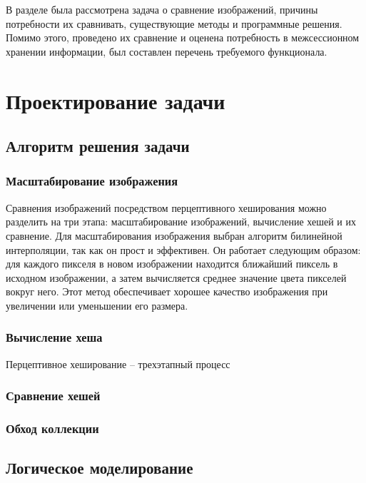 \documentclass[variant=courcework]{bsuir}
\begin{document}
В разделе была рассмотрена задача о сравнение изображений, причины потребности
их сравнивать, существующие методы и программные решения. Помимо этого,
проведено их сравнение и оценена потребность в межсессионном хранении
информации, был составлен перечень требуемого функционала.

\chapter{Проектирование задачи}

\section{Алгоритм решения задачи}

\subsection{Масштабирование изображения}
Сравнения изображений посредством перцептивного хеширования можно разделить на
три этапа: масштабирование изображений, вычисление хешей и их сравнение. Для
масштабирования изображения выбран алгоритм билинейной интерполяции, так как он
прост и эффективен. Он работает следующим образом: для каждого пикселя в новом
изображении находится ближайший пиксель в исходном изображении, а затем
вычисляется среднее значение цвета пикселей вокруг него. Этот метод обеспечивает
хорошее качество изображения при увеличении или уменьшении его размера.

\subsection{Вычисление хеша}
Перцептивное хеширование -- трехэтапный процесс

\subsection{Сравнение хешей}

\subsection{Обход коллекции}

\section{Логическое моделирование}
\end{document}
